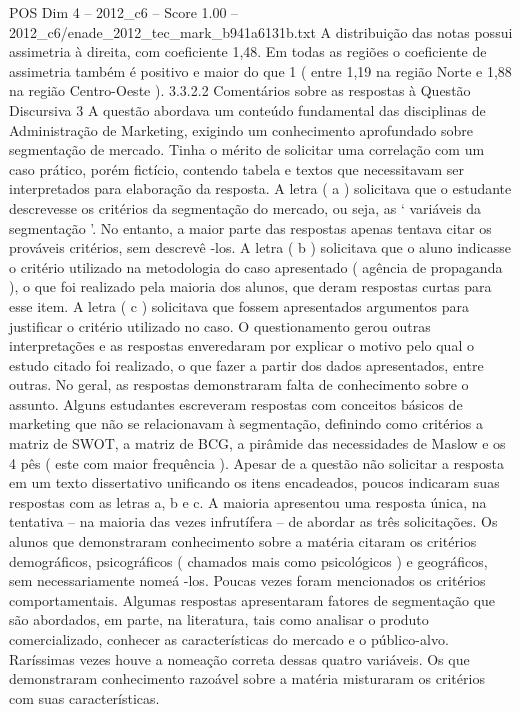 \begin{textsample}{POS Dim 4 – 2012\_c6 – Score 1.00 – 2012\_c6/enade\_2012\_tec\_mark\_b941a6131b.txt}
A distribuição das notas possui assimetria à direita, com coeficiente 1,48.
Em todas as regiões o coeficiente de assimetria também é positivo e maior do que 1 ( entre 1,19 na região Norte e 1,88 na região Centro-Oeste ). 3.3.2.2 Comentários sobre as respostas à Questão Discursiva 3 A questão abordava um conteúdo fundamental das disciplinas de Administração de Marketing, exigindo um conhecimento aprofundado sobre segmentação de mercado.
Tinha o mérito de solicitar uma correlação com um caso prático, porém fictício, contendo tabela e textos que necessitavam ser interpretados para elaboração da resposta.
A letra ( a ) solicitava que o estudante descrevesse os critérios da segmentação do mercado, ou seja, as ‘ variáveis da segmentação ’.
No entanto, a maior parte das respostas apenas tentava citar os prováveis critérios, sem descrevê -los.
A letra ( b ) solicitava que o aluno indicasse o critério utilizado na metodologia do caso apresentado ( agência de propaganda ), o que foi realizado pela maioria dos alunos, que deram respostas curtas para esse item.
A letra ( c ) solicitava que fossem apresentados argumentos para justificar o critério utilizado no caso.
O questionamento gerou outras interpretações e as respostas enveredaram por explicar o motivo pelo qual o estudo citado foi realizado, o que fazer a partir dos dados apresentados, entre outras.
No geral, as respostas demonstraram falta de conhecimento sobre o assunto.
Alguns estudantes escreveram respostas com conceitos básicos de marketing que não se relacionavam à segmentação, definindo como critérios a matriz de SWOT, a matriz de BCG, a pirâmide das necessidades de Maslow e os 4 pês ( este com maior frequência ).
Apesar de a questão não solicitar a resposta em um texto dissertativo unificando os itens encadeados, poucos indicaram suas respostas com as letras a, b e c.
A maioria apresentou uma resposta única, na tentativa – na maioria das vezes infrutífera – de abordar as três solicitações.
Os alunos que demonstraram conhecimento sobre a matéria citaram os critérios demográficos, psicográficos ( chamados mais como psicológicos ) e geográficos, sem necessariamente nomeá -los.
Poucas vezes foram mencionados os critérios comportamentais.
Algumas respostas apresentaram fatores de segmentação que são abordados, em parte, na literatura, tais como analisar o produto comercializado, conhecer as características do mercado e o público-alvo.
Raríssimas vezes houve a nomeação correta dessas quatro variáveis.
Os que demonstraram conhecimento razoável sobre a matéria misturaram os critérios com suas características.

\end{textsample}
